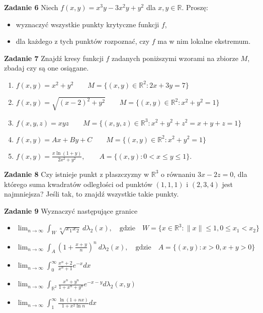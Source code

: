\documentclass[a4paper,11pt]{article}
\newcommand{\RR}{\mathbb{R}}
\begin{document}
\textbf{Zadanie 6} Niech $f(x,y)=x^3y-3x^2y+y^2$ dla $x,y \in \mathbb R$.
Proszę:
\begin{itemize}
  \item wyznaczyć wszystkie punkty krytyczne funkcji $f$,
  \item dla każdego z tych punktów rozpoznać, czy $f$ ma w nim
    lokalne
    ekstremum. 
\end{itemize}

\textbf{Zadanie 7} Znajdź kresy funkcji $f$ zadanych poniższymi wzorami
na zbiorze $M$, zbadaj czy są one osiągane.

\begin{enumerate}
  \item $f(x,y) = x^2 + y^2 \qquad M=\{(x,y) \in \mathbb{R}^2 : 2x + 3y
    = 7\}$ 
  \item $f(x,y) = \sqrt{(x-2)^2 + y^2} \qquad M=\{(x,y) \in
      \mathbb{R}^2 :
    x^2 + y^2= 1\}$ 
  \item $f(x,y,z) = xyz \qquad M=\{(x,y,z) \in
      \mathbb{R}^3 : x^2 + y^2 +
    z^2= x+y+z = 1\}$ 
  \item $f(x,y) = Ax + By + C \qquad
    M=\{(x,y) \in \mathbb{R}^2 : x^2 +
    y^2 = 1\}$ 
  \item 
    $f(x,y)=\displaystyle\frac{x
    \ln(1+y) }{2x^2+y^2},
    \qquad A=
    \{(x,y): 0<x\le y\le
    1\}$.
\end{enumerate}

\textbf{Zadanie 8} Czy istnieje punkt z płaszczyzny w $\mathbb{R}^3$ o
równaniu $3x − 2z = 0$, dla którego suma kwadratów odległości od punktów
$(1, 1, 1)$ i $(2, 3, 4)$ jest najmniejsza?  Jeśli tak, to znajdź
wszystkie takie punkty.

\textbf{Zadanie 9} Wyznaczyć następujące granice 

\begin{itemize}
  \item $\lim_{n \to \infty} \int_{W} \sqrt[n]{x_1x_2}~ d\lambda_2(x),
    \quad \text{gdzie} \quad W = \{x \in \RR^3: \|x\|\le 1, 0\le
    x_1<x_2\} $
  \item $\lim_{n \to \infty} \int_{A} \left(
    1+\frac{x+y}{n} \right)^n ~
    d\lambda_2(x), \quad \text{gdzie} \quad A =
    \{(x,y) : x>0, x+y>0\} $
  \item $\lim_{n \to \infty} \int_{0}^\infty
    \frac{x^n +2}{x^n + 1}
    e^{-x} dx$
  \item $\lim_{n\to \infty}
    \int_{\RR^2} \frac{x^n + y^n}{1+x^n
    + y^n}
    e^{-x-y} d\lambda_2(x,y)$
  \item $\lim_{n\to \infty}
    \int_1^\infty
    \frac{\ln(1+nx)}{1+x^2\ln
    n} dx$
\end{itemize}
\end{document}
